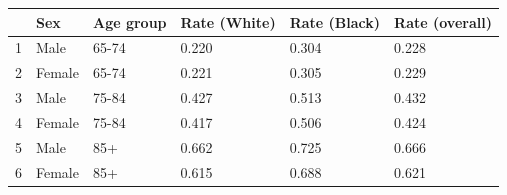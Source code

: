\begin{table}[ht]
\centering
\begin{tabular}{rlllll}
  \hline
 & Sex & Age group & Rate (White) & Rate (Black) & Rate (overall) \\ 
  \hline
1 & Male & 65-74 & 0.220 & 0.304 & 0.228 \\ 
  2 & Female & 65-74 & 0.221 & 0.305 & 0.229 \\ 
  3 & Male & 75-84 & 0.427 & 0.513 & 0.432 \\ 
  4 & Female & 75-84 & 0.417 & 0.506 & 0.424 \\ 
  5 & Male & 85+ & 0.662 & 0.725 & 0.666 \\ 
  6 & Female & 85+ & 0.615 & 0.688 & 0.621 \\ 
   \hline
\end{tabular}
\end{table}
